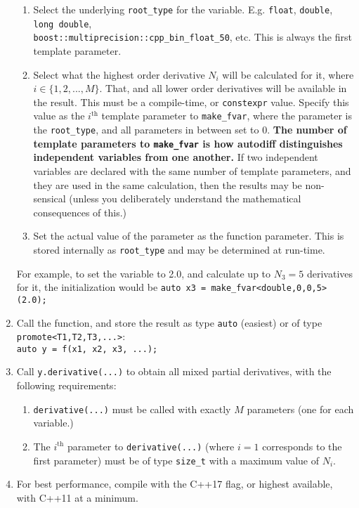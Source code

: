 \documentclass{article}
\begin{document}
\begin{enumerate}
  \begin{enumerate}
  \item Select the underlying {\tt root\_type} for the variable. E.g. {\tt float}, {\tt double}, {\tt long double},\\
    {\tt boost::multiprecision::cpp\_bin\_float\_50}, etc. This is always the first template parameter.
  \item Select what the highest order derivative $N_i$ will be calculated for it, where $i\in\{1,2,...,M\}$.
    That, and all lower order derivatives will be available in the result. This must be a compile-time, or
    {\tt constexpr} value. Specify this value as the $i^\text{th}$ template parameter to {\tt make\_fvar},
    where the  parameter is the {\tt root\_type}, and all parameters in between set to 0. {\bf The number
    of template parameters to {\tt make\_fvar} is how autodiff distinguishes independent variables from one
    another.} If two independent variables are declared with the same number of template parameters, and they
    are used in the same calculation, then the results may be non-sensical (unless you deliberately understand
    the mathematical consequences of this.)
  \item Set the actual value of the parameter as the function parameter. This is stored internally as
    {\tt root\_type} and may be determined at run-time.
  \end{enumerate}
  For example, to set the  variable to 2.0, and calculate up to $N_3=5$ derivatives for it, the initialization
  would be {\tt auto x3 = make\_fvar<double,0,0,5>(2.0);}
\item Call the function, and store the result as type {\tt auto} (easiest) or of type {\tt promote<T1,T2,T3,...>}:\\
  {\tt auto y = f(x1, x2, x3, ...);}
\item Call {\tt y.derivative(...)} to obtain all mixed partial derivatives, with the following requirements:
  \begin{enumerate}
  \item {\tt derivative(...)} must be called with exactly $M$ parameters (one for each variable.)
  \item The $i^\text{th}$ parameter to {\tt derivative(...)} (where $i=1$ corresponds to the first parameter) must
    be of type {\tt size\_t} with a maximum value of $N_i$.
  \end{enumerate}
\item For best performance, compile with the C++17 flag, or highest available, with C++11 at a minimum.
\end{enumerate}
\end{document}

